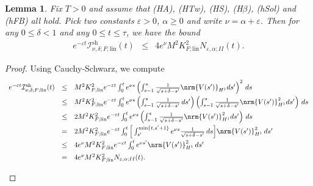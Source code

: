 \documentclass[10pt]{articleHJ}
\newcommand{\e}{\ensuremath{\varepsilon}}
\renewcommand{\d}{\ensuremath{\delta}}
\DeclarePairedDelimiter{\nrm}\lVert\rVert
\newtheorem{lem}[thm]{Lemma}
\numberwithin{equation}{section}
\begin{document}
\begin{lem}
Fix $T > 0$ and assume that (HA), (HTw), (HS),
(H$\beta$),
(hSol) and (hFB) all hold.
Pick two constants $\e > 0$, $\alpha \ge 0$
and write $\nu = \alpha + \e$.
Then for
any $0 \le \delta < 1$
and any $0 \le t \le \tau$,
we have the bound
\begin{equation}
\begin{array}{lcl}
e^{-\e t} \mathcal{I}^{\mathrm{sh}}_{\nu,\delta;F;\mathrm{lin}}(t)
 & \le & 4 e^{\nu} M^2 K_{F;\mathrm{lin}}^2
 N_{\e,\alpha;II}(t) .
\end{array}
\end{equation}
\end{lem}
\begin{proof}
Using Cauchy-Schwarz, we compute
\begin{equation}
\begin{array}{lcl}
 e^{-\e t} \mathcal{I}^{\mathrm{sh}}_{\nu,\delta;F;\mathrm{lin}}(t)
& \le &
M^2 K_{F;\mathrm{lin}}^2
e^{-\e t}\int_0^t e^{\nu s}
  \left(\int_{s-1}^{s} \frac{1}{\sqrt{s+\d-s'}} \nrm{V(s')}_{H^1} ds' \right)^2 \, ds
  \\[0.2cm]
& \le &
M^2 K_{F;\mathrm{lin}}^2
e^{-\e t}\int_0^t e^{\nu s}
  \left(\int_{s-1}^{s} \frac{1}{\sqrt{s+\d-s'}} \, ds' \right)
  \left( \int_{s-1}^{s}\frac{1}{\sqrt{s+\d-s'}} \nrm{V(s')}_{H^1}^2 ds' \right) \, ds
  \\[0.2cm]
& \le &
2 M^2 K_{F;\mathrm{lin}}^2
e^{-\e t}\int_0^t e^{\nu s}
   \left( \int_{s-1}^{s}\frac{1}{\sqrt{s+\d-s'}} \nrm{V(s')}_{H^1}^2 ds' \right) \, ds
  \\[0.2cm]
& = &
2 M^2 K_{F;\mathrm{lin}}^2
e^{-\e t}  \int_0^t  \Big[\int_{s'}^{\min\{ t,s'+1 \} }
                      e^{\nu s} \frac{1}{\sqrt{s+\d-s'}}   \, ds
                   \Big]   \nrm{V(s')}_{H^1}^2       \, ds '
\\[0.2cm]
& \le &
4 e^{\nu} M^2 K_{F;\mathrm{lin}}^2
e^{-\e t}  \int_0^t  e^{\nu s'}   \nrm{V(s')}_{H^1}^2       \, ds '
\\[0.2cm]
& = &
4 e^{\nu} M^2 K_{F;\mathrm{lin}}^2
 N_{\e,\alpha;II}(t).
\\[0.2cm]
\end{array}
\end{equation}
\end{proof}
\end{document}
